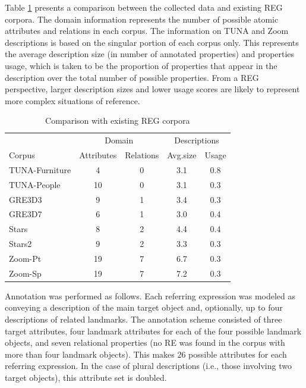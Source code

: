 \documentclass{article}
\begin{document}
Table \ref{tab-comparison} presents a comparison between the collected data and existing REG corpora. The domain information represents the number of possible atomic attributes and relations in each corpus. The information on TUNA and Zoom descriptions is based on the singular portion of each corpus only. This represents the average description size (in number of annotated properties) and properties usage, which is taken to be  the proportion of properties that appear in the description over the total number of possible properties. From a REG perspective, larger description sizes and lower usage scores are likely to represent more complex situations of reference.

\begin{table}[ht]
\begin{center}
\footnotesize{
\caption{Comparison with existing REG corpora}
\label{tab-comparison}
\begin{tabular} {  l c c c c}
\hline
\multicolumn{1}{c}{}
&\multicolumn{2}{c}{Domain}
&\multicolumn{2}{c}{Descriptions}\\
Corpus											& Attributes			& Relations			& Avg.size	& Usage \\
\hline
TUNA-Furniture							& 4								& 0							&	3.1				& 0.8   \\
TUNA-People									& 10							& 0							& 3.1				& 0.3   \\
GRE3D3											&	9								& 1							& 3.4				& 0.3   \\
GRE3D7											&	6								& 1							& 3.0				& 0.4   \\
Stars												&	8								& 2							& 4.4				& 0.4   \\
Stars2											& 9								& 2							& 3.3				& 0.3   \\
Zoom-Pt											& 19							& 7							& 6.7				& 0.3   \\
Zoom-Sp											& 19							& 7							& 7.2				& 0.3   \\
\hline
\end{tabular}
}
\end{center}
\end{table}


Annotation was performed as follows. Each referring expression was modeled as conveying a description of the main target object and, optionally, up to four descriptions of related landmarks. The annotation scheme consisted of three target attributes, four landmark attributes for each of the four possible landmark objects, and seven relational properties (no RE was found in the corpus with more than four landmark objects). This makes 26 possible attributes for each referring expression. In the case of plural descriptions (i.e., those involving two target objects), this attribute set is doubled.
\end{document}
